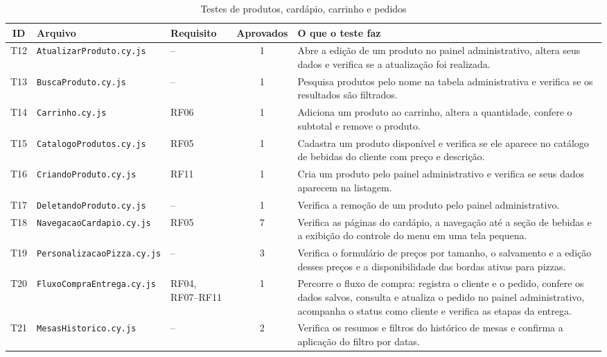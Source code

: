 \Needspace{0.8\textheight}


\begin{table}[H]
\centering
\caption{Testes de produtos, cardápio, carrinho e pedidos}
\label{tab:testes-produtos-pedidos}
\footnotesize
\setlength{\tabcolsep}{4pt}
\begin{tabularx}{\textwidth}{c p{4.2cm} p{1.8cm} c X}
\hline
\textbf{ID} & \textbf{Arquivo} & \textbf{Requisito} & \textbf{Aprovados} & \textbf{O que o teste faz} \\
\hline
T12 & \texttt{AtualizarProduto\allowbreak.cy.js} & -- & 1 & Abre a edição de um produto no painel administrativo, altera seus dados e verifica se a atualização foi realizada. \\
\hline
T13 & \texttt{BuscaProduto\allowbreak.cy.js} & -- & 1 & Pesquisa produtos pelo nome na tabela administrativa e verifica se os resultados são filtrados. \\
\hline
T14 & \texttt{Carrinho\allowbreak.cy.js} & RF06 & 1 & Adiciona um produto ao carrinho, altera a quantidade, confere o subtotal e remove o produto. \\
\hline
T15 & \texttt{CatalogoProdutos\allowbreak.cy.js} & RF05 & 1 & Cadastra um produto disponível e verifica se ele aparece no catálogo de bebidas do cliente com preço e descrição. \\
\hline
T16 & \texttt{CriandoProduto\allowbreak.cy.js} & RF11 & 1 & Cria um produto pelo painel administrativo e verifica se seus dados aparecem na listagem. \\
\hline
T17 & \texttt{DeletandoProduto\allowbreak.cy.js} & -- & 1 & Verifica a remoção de um produto pelo painel administrativo. \\
\hline
T18 & \texttt{NavegacaoCardapio\allowbreak.cy.js} & RF05 & 7 & Verifica as páginas do cardápio, a navegação até a seção de bebidas e a exibição do controle do menu em uma tela pequena. \\
\hline
T19 & \texttt{PersonalizacaoPizza\allowbreak.cy.js} & -- & 3 & Verifica o formulário de preços por tamanho, o salvamento e a edição desses preços e a disponibilidade das bordas ativas para pizzas. \\
\hline
T20 & \texttt{FluxoCompraEntrega\allowbreak.cy.js} & RF04, RF07--RF11 & 1 & Percorre o fluxo de compra: registra o cliente e o pedido, confere os dados salvos, consulta e atualiza o pedido no painel administrativo, acompanha o status como cliente e verifica as etapas da entrega. \\
\hline
T21 & \texttt{MesasHistorico\allowbreak.cy.js} & -- & 2 & Verifica os resumos e filtros do histórico de mesas e confirma a aplicação do filtro por datas. \\
\hline
\end{tabularx}
\end{table}

